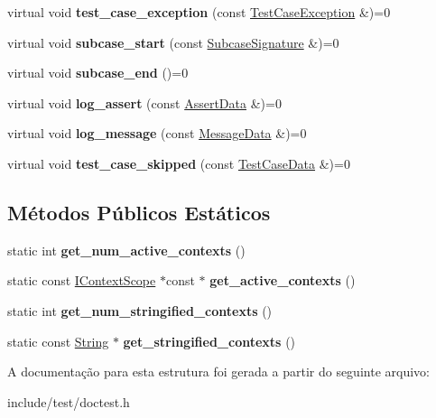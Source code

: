 \begin{DoxyCompactItemize}
virtual void {\bfseries test\+\_\+case\+\_\+exception} (const \hyperlink{structdoctest_1_1TestCaseException}{Test\+Case\+Exception} \&)=0
\item 
\mbox{\label{structdoctest_1_1IReporter_a03ef82d6fb9afe8b0e3bbe24f28dd268}} 
virtual void {\bfseries subcase\+\_\+start} (const \hyperlink{structdoctest_1_1SubcaseSignature}{Subcase\+Signature} \&)=0
\item 
\mbox{\label{structdoctest_1_1IReporter_a05196dd1a5f7e40e8c734cd2a37d4e1e}} 
virtual void {\bfseries subcase\+\_\+end} ()=0
\item 
\mbox{\label{structdoctest_1_1IReporter_a5bb54923eab233bb02f2fcfc178fa12a}} 
virtual void {\bfseries log\+\_\+assert} (const \hyperlink{structdoctest_1_1AssertData}{Assert\+Data} \&)=0
\item 
\mbox{\label{structdoctest_1_1IReporter_a2b2cb4f15aa7417d4903a0edc3147018}} 
virtual void {\bfseries log\+\_\+message} (const \hyperlink{structdoctest_1_1MessageData}{Message\+Data} \&)=0
\item 
\mbox{\label{structdoctest_1_1IReporter_ab4ecfea9cd9582aad4a5e90e0c8ba45d}} 
virtual void {\bfseries test\+\_\+case\+\_\+skipped} (const \hyperlink{structdoctest_1_1TestCaseData}{Test\+Case\+Data} \&)=0
\end{DoxyCompactItemize}
\subsection*{Métodos Públicos Estáticos}
\begin{DoxyCompactItemize}
\item 
\mbox{\label{structdoctest_1_1IReporter_a7d520de46d9104c0eeb02375fabad32d}} 
static int {\bfseries get\+\_\+num\+\_\+active\+\_\+contexts} ()
\item 
\mbox{\label{structdoctest_1_1IReporter_a67a2da62d754d3b517d6d50ef210a988}} 
static const \hyperlink{structdoctest_1_1IContextScope}{I\+Context\+Scope} $\ast$const  $\ast$ {\bfseries get\+\_\+active\+\_\+contexts} ()
\item 
\mbox{\label{structdoctest_1_1IReporter_ac8b96fef046edc609a3374a61b84797d}} 
static int {\bfseries get\+\_\+num\+\_\+stringified\+\_\+contexts} ()
\item 
\mbox{\label{structdoctest_1_1IReporter_acc1a86891876a957c6fc382af7894f99}} 
static const \hyperlink{classdoctest_1_1String}{String} $\ast$ {\bfseries get\+\_\+stringified\+\_\+contexts} ()
\end{DoxyCompactItemize}


A documentação para esta estrutura foi gerada a partir do seguinte arquivo\+:\begin{DoxyCompactItemize}
\item 
include/test/doctest.\+h\end{DoxyCompactItemize}
